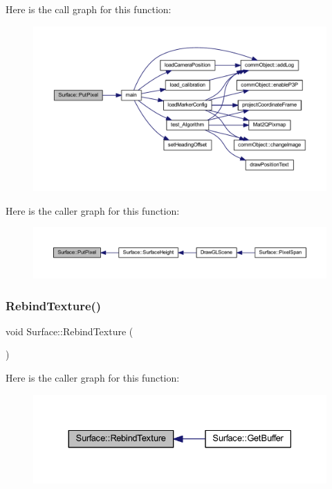 Here is the call graph for this function\+:\nopagebreak
\begin{figure}[H]
\begin{center}
\leavevmode
\includegraphics[width=350pt]{class_surface_a728571d0386e9690ce1760931562c72b_cgraph}
\end{center}
\end{figure}
Here is the caller graph for this function\+:\nopagebreak
\begin{figure}[H]
\begin{center}
\leavevmode
\includegraphics[width=350pt]{class_surface_a728571d0386e9690ce1760931562c72b_icgraph}
\end{center}
\end{figure}
\mbox{\label{class_surface_aa75c49f53fec5c49ba8422c0d64815e6}} 
\subsubsection{Rebind\+Texture()}
{\footnotesize\ttfamily void Surface\+::\+Rebind\+Texture (\begin{DoxyParamCaption}{ }\end{DoxyParamCaption})}

Here is the caller graph for this function\+:\nopagebreak
\begin{figure}[H]
\begin{center}
\leavevmode
\includegraphics[width=330pt]{class_surface_aa75c49f53fec5c49ba8422c0d64815e6_icgraph}
\end{center}
\end{figure}
\mbox{\label{class_surface_a5e45e936e3057fa1ddad0c7924767005}} 
